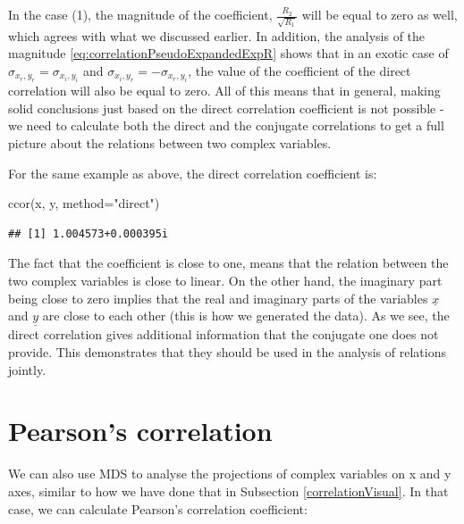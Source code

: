 \documentclass[
]{book}
\newenvironment{Shaded}{\begin{snugshade}}{\end{snugshade}}
\newcommand{\AttributeTok}[1]{\textcolor[rgb]{0.77,0.63,0.00}{#1}}
\newcommand{\FunctionTok}[1]{\textcolor[rgb]{0.00,0.00,0.00}{#1}}
\newcommand{\NormalTok}[1]{#1}
\newcommand{\StringTok}[1]{\textcolor[rgb]{0.31,0.60,0.02}{#1}}
\begin{document}
In the case (1), the magnitude of the coefficient, \(\frac{R_2}{\sqrt{R_1}}\) will be equal to zero as well, which agrees with what we discussed earlier. In addition, the analysis of the magnitude \eqref{eq:correlationPseudoExpandedExpR} shows that in an exotic case of \(\sigma_{x_r, y_r} = \sigma_{x_i, y_i}\) and \(\sigma_{x_i, y_r} = - \sigma_{x_r, y_i}\), the value of the coefficient of the direct correlation will also be equal to zero. All of this means that in general, making solid conclusions just based on the direct correlation coefficient is not possible - we need to calculate both the direct and the conjugate correlations to get a full picture about the relations between two complex variables.

For the same example as above, the direct correlation coefficient is:

\begin{Shaded}
\begin{Highlighting}[]
\FunctionTok{ccor}\NormalTok{(x, y, }\AttributeTok{method=}\StringTok{"direct"}\NormalTok{)}
\end{Highlighting}
\end{Shaded}

\begin{verbatim}
## [1] 1.004573+0.000395i
\end{verbatim}

The fact that the coefficient is close to one, means that the relation between the two complex variables is close to linear. On the other hand, the imaginary part being close to zero implies that the real and imaginary parts of the variables \(\underline{x}\) and \(\underline{y}\) are close to each other (this is how we generated the data). As we see, the direct correlation gives additional information that the conjugate one does not provide. This demonstrates that they should be used in the analysis of relations jointly.

\hypertarget{correlationMDSPearson}{%
\section{Pearson's correlation}\label{correlationMDSPearson}}

We can also use MDS to analyse the projections of complex variables on x and y axes, similar to how we have done that in Subsection \ref{correlationVisual}. In that case, we can calculate Pearson's correlation coefficient:
\end{document}
